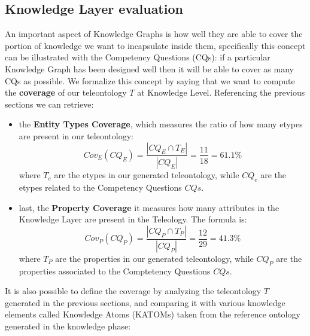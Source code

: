 \subsection{Knowledge Layer evaluation}

An important aspect of Knowledge Graphs is how well they are able
to cover the portion of knowledge we want to incapsulate inside
them, specifically this concept can be illustrated with the Competency
Questions (CQs): if a particular Knowledge Graph has been designed well
then it will be able to cover as many CQs as possible. We formalize
this concept by saying that we want to compute the \textbf{coverage}
of our teleontology $T$ at Knowledge Level. Referencing the previous
sections we can retrieve:

\begin{itemize}
	 
	\item  the \textbf{Entity Types Coverage}, which measures the ratio
	of how many etypes are present in our teleontology: 
		$$Cov_E(CQ_E) = \frac{|CQ_E \cap T_E|}{|CQ_E|} = \frac{11}{18} = 61.1\%$$
	where $T_e$ are the etypes in our generated teleontology, while $CQ_e$
	are the etypes related to the Competency Questions $CQs$.

	\item last, the \textbf{Property Coverage} it measures
	how many attributes in the Knowledge Layer are present in the
	Teleology. The formula is:
		$$Cov_{P}(CQ_{P}) = \frac{|CQ_{P} \cap T_{P}|}{|CQ_{P}|} = \frac{12}{29} = 41.3\%$$
	where $T_{P}$ are the properties in our generated teleontology, while $CQ_{P}$
	are the properties associated to the Comptetency Questions $CQs$.
\end{itemize}

It is also possible to define the coverage by analyzing the teleontology
$T$ generated in the previous sections, and comparing it with various 
knowledge elements called Knowledge Atoms (KATOMs) taken from
the reference ontology generated in the knowledge phase:

